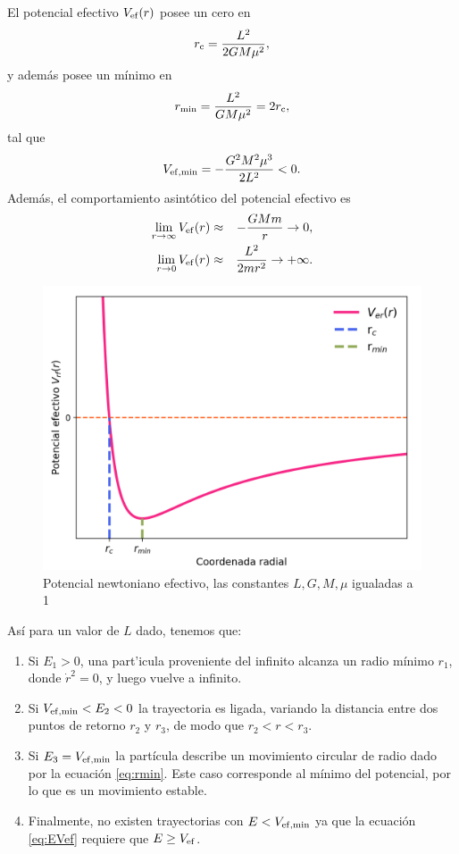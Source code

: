     El potencial efectivo $V_{\rm ef}(r)$ posee un cero en
\begin{eqnarray}
    r_{\rm c}=\frac{L^2}{2GM\mu^2} ,\label{eq:cero1}
\end{eqnarray}
y además posee un mínimo en
\begin{eqnarray}
r_{\rm min}=\frac{L^2}{GM\mu^2}=2r_{\rm c},\label{eq:rmin}
\end{eqnarray}
tal que
\begin{eqnarray*}
V_{\rm ef, min}=-\frac{G^2M^2\mu^3}{2L^2}<0.
\end{eqnarray*}
Además, el comportamiento asintótico del potencial efectivo es
\begin{eqnarray*}
\lim_{r\to\infty}V_{\rm ef}(r)&\approx&-\frac{GMm}{r}\rightarrow 0,\\
\lim_{r\to 0}V_{\rm ef}(r)&\approx&\frac{L^2}{2mr^2}\rightarrow +\infty .
\end{eqnarray*}
\begin{figure}[H]
    \centering
    \includegraphics[scale=0.6]{images/Pot_efe.png}
    \caption{Potencial newtoniano efectivo, las constantes $L,G,M,\mu$ igualadas a 1}
    \label{fig:pot}
\end{figure}
Así para un valor de $L$ dado, tenemos que:
\begin{enumerate}
    \item Si $E_1>0$, una part'icula proveniente del infinito alcanza un radio
    mínimo $r_1$, donde $\dot{r}^2=0$, y luego vuelve a infinito.
    \item Si $V_{\rm ef, min}<E_2<0$ la trayectoria es ligada, variando la distancia entre dos puntos de retorno $r_2$ y $r_3$, de modo que $r_2<r<r_{3}$.
    \item Si $E_{3}=V_{\rm ef, min}$ la partícula
    describe un movimiento circular de radio dado por la ecuación \ref{eq:rmin}. Este caso
    corresponde al mínimo del potencial, por lo que es un
    movimiento estable.
    \item Finalmente, no existen trayectorias con $E<V_{\rm ef, min}$ ya que la ecuación \ref{eq:EVef} requiere que $E\ge V_{\rm ef}$.
\end{enumerate}
